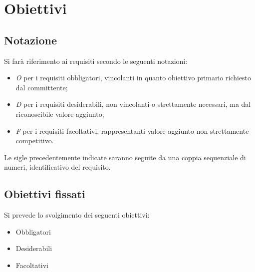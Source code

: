 \section{Obiettivi}
\subsection{Notazione}
Si farà riferimento ai requisiti secondo le seguenti notazioni:
\begin{itemize}
	\item \textit{O} per i requisiti obbligatori, vincolanti in quanto obiettivo primario richiesto dal committente;
	\item \textit{D} per i requisiti desiderabili, non vincolanti o strettamente necessari,
		  ma dal riconoscibile valore aggiunto;
	\item \textit{F} per i requisiti facoltativi, rappresentanti valore aggiunto non strettamente 
		  competitivo.
\end{itemize}

Le sigle precedentemente indicate saranno seguite da una coppia sequenziale di numeri, identificativo del requisito.

\subsection{Obiettivi fissati}
Si prevede lo svolgimento dei seguenti obiettivi:
\begin{itemize}
	\item Obbligatori
	\begin{itemize}
		\obiettiviObbligatori
	\end{itemize}
	
	\item Desiderabili 
	\begin{itemize}
		\obiettiviDesiderabili
	\end{itemize}
	
	\item Facoltativi
	\begin{itemize}
		\obiettiviFacoltativi
	\end{itemize} 
\end{itemize}

\newpage